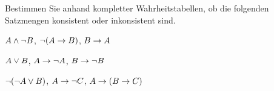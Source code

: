 \problempart
\label{pr.TT.satisfiable2}
Bestimmen Sie anhand kompletter Wahrheitstabellen, ob die folgenden Satzmengen konsistent oder inkonsistent sind. 
\begin{earg}
\item $A \wedge \neg B$, $\neg(A \rightarrow B)$, $B \rightarrow A$\vspace{.5ex} %


\item $A \vee B$, $A \rightarrow \neg A$, $B \rightarrow \neg B$ \vspace{.5ex}%


\item $\neg(\neg A \vee B) $, $A \rightarrow \neg C$, $A \rightarrow (B \rightarrow C)$\vspace{.5ex} %


\end{earg}
